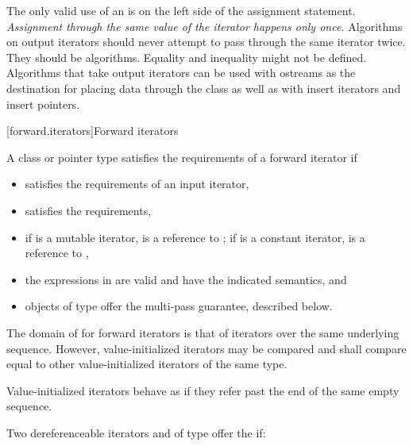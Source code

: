\pnum
\begin{note}
The only valid use of an
is on the left side of the assignment statement.
\textit{Assignment through the same value of the iterator happens only once.}
Algorithms on output iterators should never attempt to pass through the same iterator twice.
They should be
algorithms.
Equality and inequality might not be defined.
Algorithms that take output iterators can be used with ostreams as the destination
for placing data through the
class as well as with insert iterators and insert pointers.
\end{note}

[forward.iterators]{Forward iterators}

\pnum
A class or pointer type
satisfies the requirements of a forward iterator if

\begin{itemize}
\item {} satisfies the requirements of an input iterator,

\item {} satisfies the 
requirements,

\item if  is a mutable iterator,  is a reference to ;
if  is a constant iterator,  is a reference to ,

\item the expressions in 
are valid and have the indicated semantics, and

\item objects of type  offer the multi-pass guarantee, described below.
\end{itemize}

\pnum
The domain of \tcode{==} for forward iterators is that of iterators over the same
underlying sequence. However, value-initialized iterators may be compared and
shall compare equal to other value-initialized iterators of the same type.
\begin{note} Value-initialized iterators behave as if they refer past the end of
the same empty sequence. \end{note}

\pnum
Two dereferenceable iterators  and  of type  offer the
 if:


